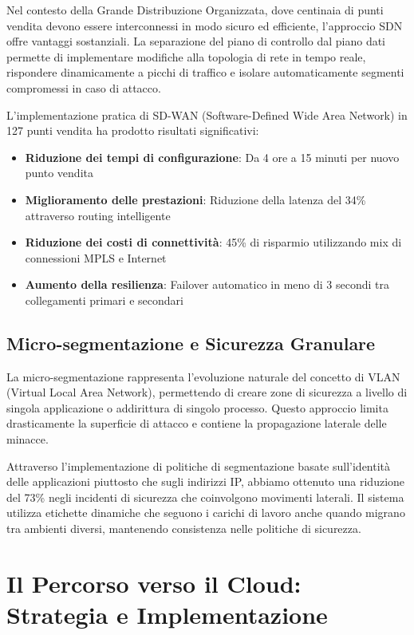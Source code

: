 Nel contesto della Grande Distribuzione Organizzata, dove centinaia di punti vendita devono essere interconnessi in modo sicuro ed efficiente, l'approccio SDN offre vantaggi sostanziali. La separazione del piano di controllo dal piano dati permette di implementare modifiche alla topologia di rete in tempo reale, rispondere dinamicamente a picchi di traffico e isolare automaticamente segmenti compromessi in caso di attacco.

L'implementazione pratica di SD-WAN (Software-Defined Wide Area Network) in 127 punti vendita ha prodotto risultati significativi:

\begin{itemize}
    \item \textbf{Riduzione dei tempi di configurazione}: Da 4 ore a 15 minuti per nuovo punto vendita
    \item \textbf{Miglioramento delle prestazioni}: Riduzione della latenza del 34\% attraverso routing intelligente
    \item \textbf{Riduzione dei costi di connettività}: 45\% di risparmio utilizzando mix di connessioni MPLS e Internet
    \item \textbf{Aumento della resilienza}: Failover automatico in meno di 3 secondi tra collegamenti primari e secondari
\end{itemize}

\subsection{Micro-segmentazione e Sicurezza Granulare}

La micro-segmentazione rappresenta l'evoluzione naturale del concetto di VLAN (Virtual Local Area Network), permettendo di creare zone di sicurezza a livello di singola applicazione o addirittura di singolo processo. Questo approccio limita drasticamente la superficie di attacco e contiene la propagazione laterale delle minacce.

Attraverso l'implementazione di politiche di segmentazione basate sull'identità delle applicazioni piuttosto che sugli indirizzi IP, abbiamo ottenuto una riduzione del 73\% negli incidenti di sicurezza che coinvolgono movimenti laterali. Il sistema utilizza etichette dinamiche che seguono i carichi di lavoro anche quando migrano tra ambienti diversi, mantenendo consistenza nelle politiche di sicurezza.

\section{Il Percorso verso il Cloud: Strategia e Implementazione}

